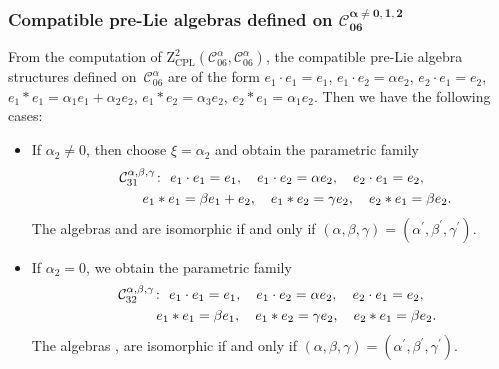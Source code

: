 \documentclass[10pt,a4paper]{amsart}
\numberwithin{equation}{section}
\begin{document}
\subsubsection[Compatible pre-Lie algebras defined on C\_\{06\}\^{}\{alpha not= 0,1,2\}]{Compatible pre-Lie algebras defined on $\boldsymbol{\mathcal{C}_{06}^{\alpha \neq 0,1,2}}$}

From the computation of $\mathrm{Z}_{\mathrm{CPL}}^{2}(\mathcal{C}%
_{06}^{\alpha },\mathcal{C}_{06}^{\alpha })$, the compatible pre-Lie algebra
structures defined on~$\mathcal{C}_{06}^{\alpha }$ are of the form
$e_{1}\cdot e_{1}=e_{1}$, $e_{1}\cdot e_{2}=\alpha e_{2}$, $e_{2}\cdot
e_{1}=e_{2}$, $e_{1}\ast e_{1}=\alpha _{1}e_{1}+\alpha _{2}e_{2}$, $e_{1}\ast
e_{2}=\alpha _{3}e_{2}$, $e_{2}\ast e_{1}=\alpha _{1}e_{2}$.
Then we have the following cases:
\begin{itemize}\itemsep=0pt
\item If $\alpha _{2}\neq 0$, then choose $\xi =\alpha _{2}$ and obtain the
parametric family
\begin{gather*}
\mathcal{C}_{31}^{\alpha ,\beta ,\gamma } \colon \
e_{1}\cdot e_{1}=e_{1}, \quad e_{1}\cdot e_{2}=\alpha e_{2}, \quad e_{2}\cdot
e_{1}=e_{2}, \\
\hphantom{\mathcal{C}_{31}^{\alpha ,\beta ,\gamma } \colon} \
e_{1}\ast e_{1}=\beta e_{1}+e_{2},\quad e_{1}\ast e_{2}=\gamma e_{2},\quad
e_{2}\ast e_{1}=\beta e_{2}.
\end{gather*}
The algebras  and  are isomorphic
if and only if $(\alpha, \beta, \gamma)=(\alpha ^{\prime },\beta ^{\prime },
\gamma ^{\prime })$.

\item If $\alpha _{2}=0$, we obtain the parametric family
\begin{gather*}
\mathcal{C}_{32}^{\alpha ,\beta ,\gamma } \colon \
e_{1}\cdot e_{1}=e_{1},\quad e_{1}\cdot e_{2}=\alpha e_{2},\quad e_{2}\cdot
e_{1}=e_{2}, \\
\hphantom{\mathcal{C}_{32}^{\alpha ,\beta ,\gamma } \colon} \
e_{1}\ast e_{1}=\beta e_{1},\quad e_{1}\ast e_{2}=\gamma e_{2},\quad
e_{2}\ast e_{1}=\beta e_{2}.
\end{gather*}
The algebras , \smash{$\mathcal{C}%
_{32}^{\alpha ^{\prime },\beta ^{\prime },\gamma ^{\prime }}$} are isomorphic
if and only if $(\alpha, \beta, \gamma)=(\alpha ^{\prime },\beta ^{\prime },
\gamma ^{\prime })$.
\end{itemize}
\end{document}
